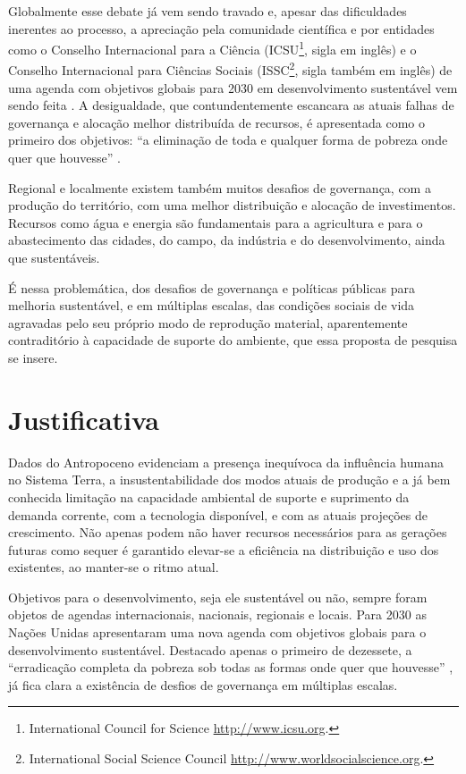 \documentclass[
	12pt,				%
	openany,			%
	oneside,			%
	a4paper,			%
	english,			%
	french,				%
	spanish,			%
	brazil,				%
	]{abntex2}
\begin{document}
Globalmente esse debate já vem sendo travado e, apesar das dificuldades inerentes ao processo, a apreciação pela comunidade científica e por entidades como o Conselho Internacional para a Ciência (ICSU\footnote{International Council for Science \url{http://www.icsu.org}.}, sigla em inglês) e o Conselho Internacional para Ciências Sociais (ISSC\footnote{International Social Science Council \url{http://www.worldsocialscience.org}.}, sigla também em inglês) de uma agenda com objetivos globais para 2030 em desenvolvimento sustentável vem sendo feita \cite{united_nations_transforming_2015,icsu-issc_review_2015}. A desigualdade, que contundentemente escancara as atuais falhas de governança e alocação melhor distribuída de recursos, é apresentada como o primeiro dos objetivos: ``a eliminação de toda e qualquer forma de pobreza onde quer que houvesse'' \cite{united_nations_transforming_2015}.

Regional e localmente existem também muitos desafios de governança, com a produção do território, com uma melhor distribuição e alocação de investimentos. Recursos como água e energia são fundamentais para a agricultura e para o abastecimento das cidades, do campo, da indústria e do desenvolvimento, ainda que sustentáveis.

É nessa problemática, dos desafios de governança e políticas públicas para melhoria sustentável, e em múltiplas escalas, das condições sociais de vida agravadas pelo seu próprio modo de reprodução material, aparentemente contraditório à capacidade de suporte do ambiente, que essa proposta de pesquisa se insere.


\section{Justificativa}

Dados do Antropoceno evidenciam a presença inequívoca da influência humana no Sistema Terra, a insustentabilidade dos modos atuais de produção e a já bem conhecida limitação na capacidade ambiental de suporte e suprimento da demanda corrente, com a tecnologia disponível, e com as atuais projeções de crescimento. Não apenas podem não haver recursos necessários para as gerações futuras como sequer é garantido elevar-se a eficiência na distribuição e uso dos existentes, ao manter-se o ritmo atual.

Objetivos para o desenvolvimento, seja ele sustentável ou não, sempre foram objetos de agendas internacionais, nacionais, regionais e locais. Para 2030 as Nações Unidas apresentaram uma nova agenda com objetivos globais para o desenvolvimento sustentável. Destacado apenas o primeiro de dezessete, a ``erradicação completa da pobreza sob todas as formas onde quer que houvesse'' \cite{united_nations_transforming_2015}, já fica clara a existência de desfios de governança em múltiplas escalas.
\end{document}
